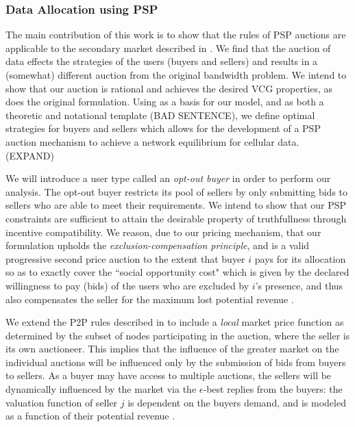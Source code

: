 \documentclass[12pt]{article}
\theoremstyle{definition}
\begin{document}
\begin{multicols}{2}
\subsubsection{Data Allocation using PSP}

The main contribution of this work is to show that the rules of PSP auctions are applicable to the
secondary market described in \cite{zheng}. We find that the auction of data effects the
strategies of the users (buyers and sellers) and results in a (somewhat) different
auction from the original bandwidth problem. We intend to show that our auction
is rational and achieves the desired VCG properties, as does the original
formulation. Using \cite{zheng} as a basis for our model, and \cite{lazar} as
both a theoretic and notational template (BAD SENTENCE), we define optimal strategies for
buyers and sellers which allows for the development of a PSP auction mechanism
to achieve a network equilibrium for cellular data. (EXPAND)

We will introduce a user type called an \emph{opt-out buyer} in order to perform our analysis. The
opt-out buyer restricts its pool of sellers by only submitting bids to sellers
who are able to meet their requirements.
We intend to show that our PSP constraints are
sufficient to attain the desirable property of truthfullness through incentive compatibility. We
reason, due to our pricing mechanism, that our formulation upholds the \emph{exclusion-compensation
principle}, and is a valid progressive second price auction to the extent that buyer $i$
pays for its allocation so as to exactly cover the ``social opportunity cost" which is given by the declared willingness to pay (bids) of the users who are excluded by $i$'s
presence, and thus also compensates the seller for the maximum lost potential
revenue \cite{lazar}.

We extend the P2P rules described in \cite{semret} to include a \emph{local} market
price function as determined by the subset of nodes participating in the
auction, where the seller is its own auctioneer. This implies that the influence of the greater market on the individual
auctions will be influenced only by the submission of bids from buyers to
sellers. As a buyer may have access to multiple auctions, the sellers will be
dynamically influenced by the market via the $\epsilon$-best replies from the
buyers: the
valuation function of seller $j$ is dependent on the buyers demand, and is
modeled as a function of their potential revenue \cite{semret}. 

 


\end{multicols}
\end{document}
